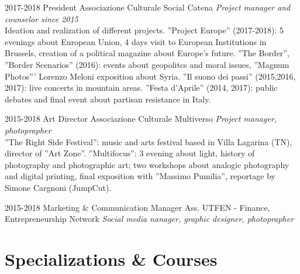 \documentclass[]{friggeri-cv}
\begin{document}
\begin{entrylist}

\entry
    {2017-2018}
    {President}
    {Associazione Culturale Social Catena}
    {\emph{Project manager and counselor since 2015}\\
    Ideation and realization of different projects. ''Project Europe'' (2017-2018): 5 evenings about European Union, 4 days visit to European Institutions in Brussels, creation of a political magazine about Europe's future. ''The Border'', ''Border Scenarios'' (2016): events about geopolitcs and moral issues, ''Magnum Photos''' Lorenzo Meloni exposition about Syria. ''Il suono dei passi'' (2015,2016, 2017): live concerts in mountain areas. ''Festa d’Aprile'' (2014, 2017): public debates and final event about partisan resistance in Italy.
    }

\entry
    {2015-2018}
    {Art Director}
    {Associazione Culturale Multiverso}
    {\emph{Project manager, photoprapher}\\
    ''The Right Side Festival'': music and arts festival based in Villa Lagarina (TN), director of ''Art Zone''. ''Multifocus'': 3 evening about light, history of photography and photographic art; two workshops about analogic photography and digital printing, final exposition with ''Massimo Pumilia'', reportage by Simone Cargnoni (JumpCut).
    }

\entry
    {2015-2018}
    {Marketing \& Communication Manager}
    {Ass. UTFEN - Finance, Entrepreneurship Network}
    {\emph{Social media nanager, graphic designer, photoprapher}}

\end{entrylist}


\section{Specializations \& Courses}
\end{document}
